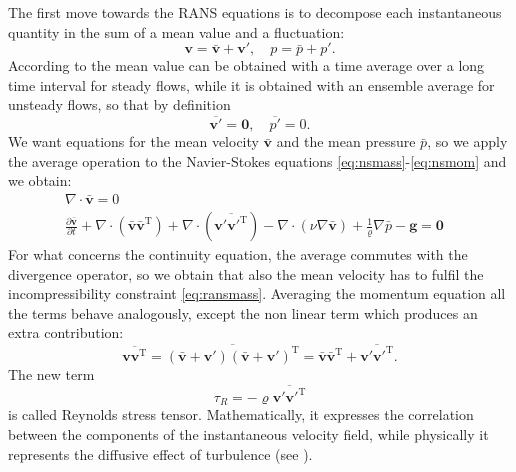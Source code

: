 The first move towards the RANS equations is to decompose each instantaneous 
quantity in the sum of a mean value and a fluctuation: 
\begin{equation} \label{eq:decomp}
\mathbf{v} = \bar{\mathbf{v}} + \mathbf{v}', \quad p = \bar{p} + p'.
\end{equation}
According to \cite{main:vermal} the mean value can be obtained with a time 
average over a long time interval 
for steady flows, while it is obtained with an ensemble average for unsteady 
flows, so that by definition
\begin{equation}
	\overline{\mathbf{v}'} = \mathbf{0}, \quad \overline{p'}=0.
\end{equation}
We want equations for the mean 
velocity $\bar{\mathbf{v}}$ and the mean pressure $\bar{p}$, so we apply the 
average operation to the Navier-Stokes equations 
\eqref{eq:nsmass}-\eqref{eq:nsmom} and we obtain:
\begin{align}
\label{eq:ransmass} \nabla \cdot \bar{\mathbf{v}} = 0&\\
\label{eq:ransmom} \frac{\partial \bar{\mathbf{v}}}{\partial t} + \nabla \cdot 
( 
\bar{\mathbf{v}} \bar{\mathbf{v}}^\mathrm{T}) + \nabla \cdot 
(\overline{\mathbf{v}' {\mathbf{v}'}^\mathrm{T}})- \nabla \cdot (\nu \nabla 
\bar{\mathbf{v}}) +\frac{1}{\varrho} \nabla \bar{p} - \mathbf{g} = \mathbf{0}&
\end{align}
For what concerns the continuity equation, the average commutes with the 
divergence operator, so we obtain that also the mean velocity has to fulfil the 
incompressibility constraint \eqref{eq:ransmass}. Averaging the momentum 
equation all the terms behave analogously, except the non linear term which 
produces an extra contribution:
\begin{equation}
	\overline{\mathbf{v} \mathbf{v}^\mathrm{T}} = \overline{(\bar{\mathbf{v}} + 
	\mathbf{v}') (\bar{\mathbf{v}} + \mathbf{v}')^\mathrm{T}} = 
	\bar{\mathbf{v}} \bar{\mathbf{v}}^\mathrm{T} + \overline{\mathbf{v}' 
	{\mathbf{v}'}^\mathrm{T}}.
\end{equation}
The new term
\begin{equation}
\tau_R = -\varrho \overline{\mathbf{v}' {\mathbf{v}'}^\mathrm{T}}
\end{equation}
is called Reynolds stress tensor. Mathematically, it expresses the correlation 
between the components of the instantaneous velocity field, while physically it 
represents the diffusive effect of turbulence (see \cite{main:vermal}).
%
